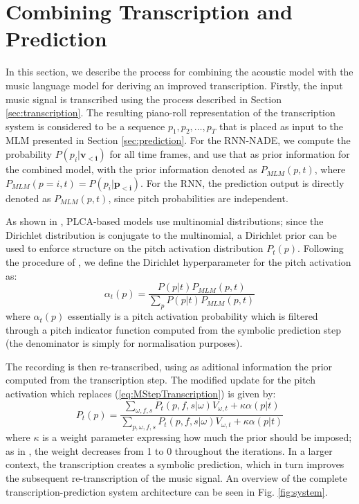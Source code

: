 \section{Combining Transcription and Prediction}
\label{sec:combination}


In this section, we describe the process for combining the acoustic model with the music language model for deriving an improved transcription. Firstly, the input music signal is transcribed using the process described in Section \ref{sec:transcription}. The resulting piano-roll representation of the transcription system is considered to be a sequence $p_1, p_2, \ldots, p_T$ that is placed as input to the MLM presented in Section \ref{sec:prediction}. For the RNN-NADE, we compute the probability $P(p_i|\mathbf{v_{<i}})$ for all time frames, and use that as prior information for the combined model, with the prior information  denoted as $P_{\mathit{MLM}}(p,t)$, where $P_{\mathit{MLM}}(p=i,t)=P(p_i|\mathbf{p_{<i}})$. For the RNN, the prediction output is directly denoted as $P_{\mathit{MLM}}(p,t)$, since pitch probabilities are independent.

As shown in \cite{Smaragdis2009}, PLCA-based models use multinomial distributions; since the Dirichlet distribution is conjugate to the multinomial, a Dirichlet prior can be used to enforce structure on the pitch activation distribution $P_{t}(p)$. Following the procedure of \cite{Smaragdis2009}, we define the Dirichlet hyperparameter for the pitch activation as:
\begin{equation}
 \alpha_{t}(p) = \frac{P(p|t)P_{\mathit{MLM}}(p,t)}{\sum_{p}P(p|t)P_{\mathit{MLM}}(p,t)}
\end{equation}
where $\alpha_{t}(p)$ essentially is a pitch activation probability which is filtered through a pitch indicator function computed from the symbolic prediction step (the denominator is simply for normalisation purposes).

The recording is then re-transcribed, using as aditional information the prior computed from the transcription step. The modified update for the pitch activation which replaces (\ref{eq:MStepTranscription}) is given by:
\begin{equation}
 P_{t}(p) = \frac{\sum_{\omega,f,s}P_{t}(p,f,s|\omega)V_{\omega,t}+\kappa\alpha(p|t)}{\sum_{p,\omega,f,s}P_{t}(p,f,s|\omega)V_{\omega,t}+\kappa\alpha(p|t)} \label{eq:modifiedMStepPitchActivation}
\end{equation}
where $\kappa$ is a weight parameter expressing how much the prior should be imposed; as in \cite{Smaragdis2009}, the weight decreases from 1 to 0 throughout the iterations. In a larger context, the transcription creates a symbolic prediction, which in turn improves the subsequent re-transcription of the music signal. An overview of the complete transcription-prediction system architecture can be seen in Fig. \ref{fig:system}.

